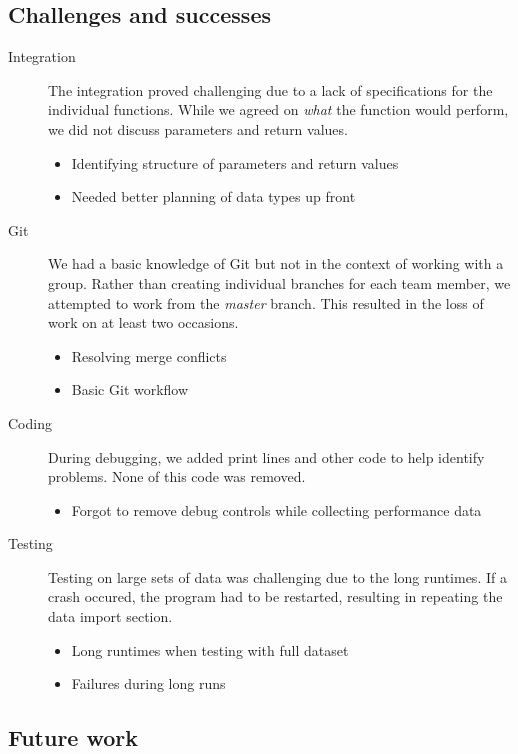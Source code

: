 \documentclass{article}
\begin{document}
\subsection{Challenges and successes}
\begin{description}
    \item [Integration]{The integration proved challenging due to a lack of specifications for the individual functions. While we agreed on \textit{what} the function would perform, we did not discuss parameters and return values.}
		\begin{itemize}
			\item Identifying structure of parameters and return values
			\item Needed better planning of data types up front
		\end{itemize}
    \item [Git]{We had a basic knowledge of Git but not in the context of working with a group. Rather than creating individual branches for each team member, we attempted to work from the \textit{master} branch. This resulted in the loss of work on at least two occasions.}
		\begin{itemize}
			\item Resolving merge conflicts
			\item Basic Git workflow
		\end{itemize}
    \item [Coding]{During debugging, we added print lines and other code to help identify problems. None of this code was removed.}
		\begin{itemize}
			\item Forgot to remove debug controls while collecting performance data
		\end{itemize}
    \item [Testing]{Testing on large sets of data was challenging due to the long runtimes. If a crash occured, the program had to be restarted, resulting in repeating the data import section.}
		\begin{itemize}
			\item Long runtimes when testing with full dataset
			\item Failures during long runs
		\end{itemize}
\end{description}

\subsection{Future work}
\end{document}
